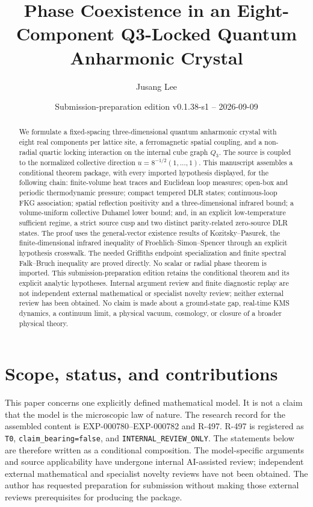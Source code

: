 \documentclass[11pt]{article}
\title{Phase Coexistence in an Eight-Component Q3-Locked Quantum Anharmonic Crystal}
\author{Jusang Lee}
\date{Submission-preparation edition v0.1.38-s1 -- 2026-09-09}
\numberwithin{equation}{section}
\theoremstyle{definition}
\begin{document}
\maketitle

\begin{abstract}
We formulate a fixed-spacing three-dimensional quantum anharmonic crystal
with eight real components per lattice site, a ferromagnetic spatial coupling,
and a non-radial quartic locking interaction on the internal cube graph
$Q_3$.  The source is coupled to the normalized collective direction
$u=8^{-1/2}(1,\ldots,1)$.  This manuscript assembles a conditional theorem
package, with every imported hypothesis displayed, for the following chain:
finite-volume heat traces and Euclidean loop measures; open-box and periodic
thermodynamic pressure; compact tempered DLR states; continuous-loop FKG
association; spatial reflection positivity and a three-dimensional infrared
bound; a volume-uniform collective Duhamel lower bound; and, in an explicit
low-temperature sufficient regime, a strict source cusp and two distinct
parity-related zero-source DLR states.  The proof uses the general-vector
existence results of Kozitsky--Pasurek, the finite-dimensional infrared
inequality of Froehlich--Simon--Spencer through an explicit hypothesis
crosswalk.  The needed Griffiths endpoint specialization and finite spectral
Falk--Bruch inequality are proved directly.  No scalar or
radial phase theorem is imported.  This submission-preparation edition retains the conditional theorem and
its explicit analytic hypotheses. Internal argument review and finite
diagnostic replay are not independent external mathematical or specialist
novelty review; neither external review has been obtained. No claim is made
about a ground-state gap, real-time KMS dynamics, a continuum limit, a
physical vacuum, cosmology, or closure of a broader physical theory.
\end{abstract}

\section{Scope, status, and contributions}

This paper concerns one explicitly defined mathematical model.  It is not a
claim that the model is the microscopic law of nature.  The research record
for the assembled content is EXP-000780--EXP-000782 and R-497.  R-497 is
registered as \texttt{T0}, \texttt{claim\_bearing=false}, and
\texttt{INTERNAL\_REVIEW\_ONLY}.  The statements below are therefore written
as a conditional composition. The model-specific arguments and source
applicability have undergone internal AI-assisted review; independent
external mathematical and specialist novelty reviews have not been obtained.
The author has requested preparation for submission without making those
external reviews prerequisites for producing the package.
\end{document}
